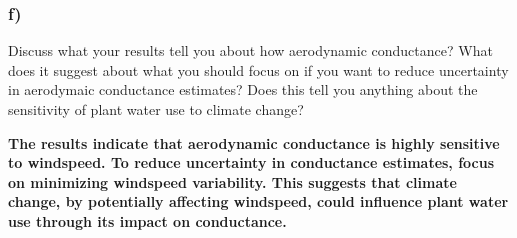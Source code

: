 \documentclass[
  letterpaper,
  DIV=11,
  numbers=noendperiod]{scrartcl}
\begin{document}
\hypertarget{f}{%
\subsubsection{f)}\label{f}}

Discuss what your results tell you about how aerodynamic conductance?
What does it suggest about what you should focus on if you want to
reduce uncertainty in aerodymaic conductance estimates? Does this tell
you anything about the sensitivity of plant water use to climate change?

\textbf{The results indicate that aerodynamic conductance is highly
sensitive to windspeed. To reduce uncertainty in conductance estimates,
focus on minimizing windspeed variability. This suggests that climate
change, by potentially affecting windspeed, could influence plant water
use through its impact on conductance.}
\end{document}
